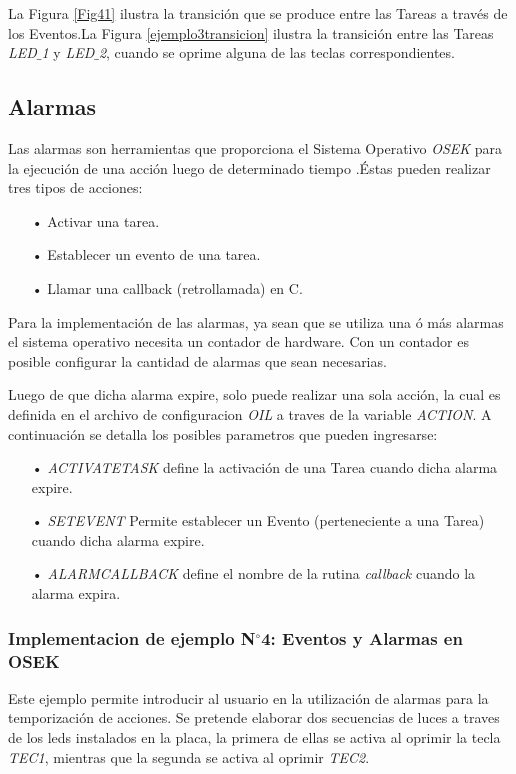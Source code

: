 \documentclass[12pt,letterpaper]{article}
\begin{document}
La Figura \ref{Fig41} ilustra la transición que se produce entre las Tareas a través de los Eventos.La Figura \ref{ejemplo3transicion} ilustra la transición entre las Tareas \textit{LED$\_$1} y \textit{LED$\_$2}, cuando se oprime alguna de las teclas correspondientes.
\subsection{Alarmas}
Las alarmas son herramientas que proporciona el Sistema Operativo \textit{OSEK} para la ejecución de una acción luego de determinado tiempo \cite{libroosekcerdeiro}.Éstas pueden realizar tres tipos de acciones:
\begin{enumerate}
\item[•]Activar una tarea.
\item[•]Establecer un evento de una tarea.
\item[•]Llamar una callback (retrollamada) en C.
\end{enumerate}
Para la implementación de las alarmas, ya sean que se utiliza una ó más alarmas el sistema operativo necesita un contador de hardware. Con un contador es posible configurar la cantidad de alarmas que sean necesarias.

Luego de que dicha alarma expire, solo puede realizar una sola acción, la cual es definida en el archivo de configuracion \textit{OIL} a traves de la variable \textit{ACTION}. A continuación se detalla los posibles parametros que pueden ingresarse:
\begin{enumerate}
\item[•]\textit{ACTIVATETASK} define la activación de una Tarea cuando dicha alarma expire.
\item[•]\textit{SETEVENT} Permite establecer un Evento (perteneciente a una Tarea) cuando dicha alarma expire.
\item[•]\textit{ALARMCALLBACK} define el nombre de la rutina \textit{callback} cuando la alarma expira.
\end{enumerate}
\subsubsection{Implementacion de ejemplo N$^{\circ}$4: Eventos y Alarmas en OSEK}
Este ejemplo permite introducir al usuario en la utilización de alarmas para la temporización de acciones. Se pretende elaborar dos secuencias de luces a traves de los leds instalados en la placa, la primera de ellas se activa al oprimir la tecla \textit{TEC1}, mientras que la segunda se activa al oprimir \textit{TEC2}.
\end{document}
